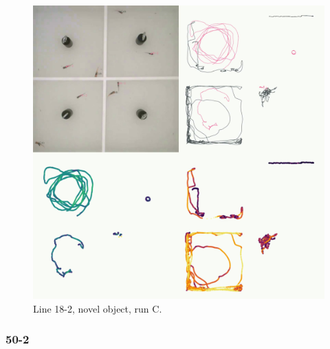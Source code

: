 \documentclass[
]{book}
\begin{document}
\begin{figure}
\includegraphics[width=1\linewidth]{figs/mikk_behaviour/four_panel_plots/novel_object_20191119_1459_18-2_R_C_300} \caption{Line 18-2, novel object, run C.}\label{fig:4p-18-2-no-C}
\end{figure}

\hypertarget{section-8}{%
\subsubsection{50-2}\label{section-8}}
\end{document}
